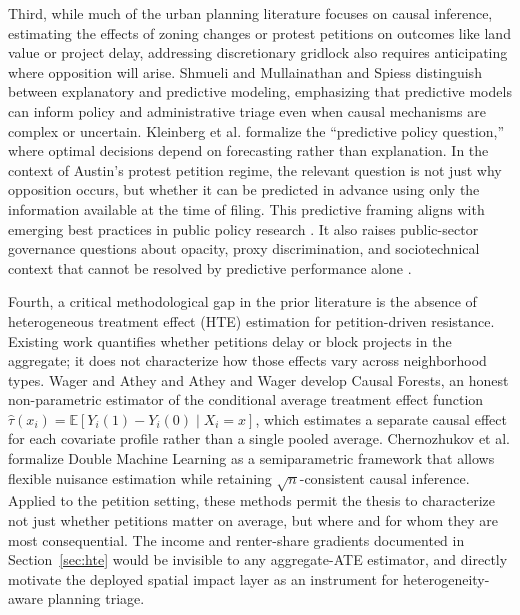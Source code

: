 \documentclass[11pt, letterpaper, oneside]{article}
\begin{document}
Third, while much of the urban planning literature focuses on causal inference, estimating the effects of zoning changes or protest petitions on outcomes like land value or project delay, addressing discretionary gridlock also requires anticipating where opposition will arise. Shmueli \cite{shmueli2010} and Mullainathan and Spiess \cite{mullainathan2017ml} distinguish between explanatory and predictive modeling, emphasizing that predictive models can inform policy and administrative triage even when causal mechanisms are complex or uncertain. Kleinberg et al. \cite{kleinberg2015prediction} formalize the ``predictive policy question,'' where optimal decisions depend on forecasting rather than explanation. In the context of Austin's protest petition regime, the relevant question is not just why opposition occurs, but whether it can be predicted in advance using only the information available at the time of filing. This predictive framing aligns with emerging best practices in public policy research \cite{athey2019ml}. It also raises public-sector governance questions about opacity, proxy discrimination, and sociotechnical context that cannot be resolved by predictive performance alone \cite{eubanks2018,oneil2016weapons,barocas2016,selbst2019fairness}.

Fourth, a critical methodological gap in the prior literature is the absence of heterogeneous treatment effect (HTE) estimation for petition-driven resistance. Existing work quantifies whether petitions delay or block projects in the aggregate; it does not characterize how those effects vary across neighborhood types. Wager and Athey \cite{wager2018estimation} and Athey and Wager \cite{athey2019generalized} develop Causal Forests, an honest non-parametric estimator of the conditional average treatment effect function $\hat{\tau}(x_i) = \mathbb{E}[Y_i(1) - Y_i(0) \mid X_i = x]$, which estimates a separate causal effect for each covariate profile rather than a single pooled average. Chernozhukov et al. \cite{chernozhukov2018dml} formalize Double Machine Learning as a semiparametric framework that allows flexible nuisance estimation while retaining $\sqrt{n}$-consistent causal inference. Applied to the petition setting, these methods permit the thesis to characterize not just whether petitions matter on average, but where and for whom they are most consequential. The income and renter-share gradients documented in Section~\ref{sec:hte} would be invisible to any aggregate-ATE estimator, and directly motivate the deployed spatial impact layer as an instrument for heterogeneity-aware planning triage.
\end{document}
